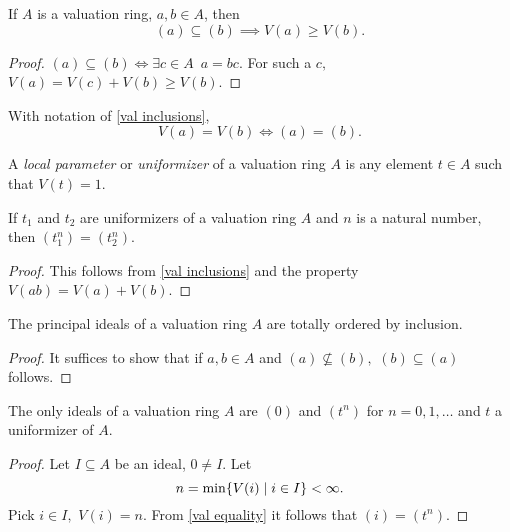 \begin{lemma}
  \label{val inclusions}
  If \(A\) is a valuation ring, \(a, b \in A\), then
  \[(a) \subseteq (b) \implies V(a) \geq V(b).\]
\end{lemma}
\begin{proof}
  \((a) \subseteq (b) \iff \exists c \in A \enspace a = bc.\) For such a \(c,\) \(V(a) = V(c) + V(b) \geq V(b).\)
\end{proof}

\begin{corollary}
  \label{val equality}
  With notation of \cref{val inclusions},
  \[V(a) = V(b) \iff (a) = (b).\]
\end{corollary}

\begin{df}
  A \emph{local parameter} or \emph{uniformizer} of a valuation ring \(A\) is any element \(t \in A\) such that \(V(t) = 1.\)
\end{df}

\begin{prop}
  If \(t_1\) and \(t_2\) are uniformizers of a valuation ring \(A\) and \(n\) is a natural number, then \((t_1^n) = (t_2^n).\)
\end{prop}
\begin{proof}
  This follows from \cref{val inclusions} and the property \(V(ab) = V(a) + V(b).\)
\end{proof}

\begin{corollary}
  The principal ideals of a valuation ring \(A\) are totally ordered by inclusion.
\end{corollary}
\begin{proof}
  It suffices to show that if \(a, b \in A\) and \((a) \not\subseteq (b),\) \((b) \subseteq (a)\) follows.
\end{proof}

\begin{lemma}
  The only ideals of a valuation ring \(A\) are \((0)\) and \((t^n)\) for \(n = 0, 1, \dotsc\) and \(t\) a uniformizer of \(A.\)
\end{lemma}
\begin{proof}
  Let \(I \subseteq A\) be an ideal, \(0 \neq I.\) Let
  \[n = \min\{V(i) \mathrel{|} i \in I\} < \infty.\]
  Pick \(i \in I,\) \(V(i) = n.\)
  From \cref{val equality} it follows that \((i) = (t^n).\)
\end{proof}

